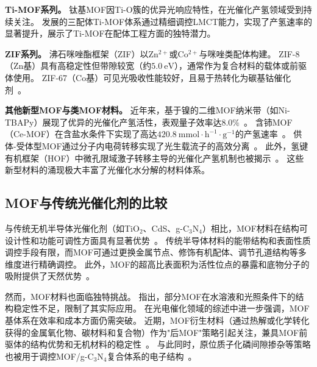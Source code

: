 \textbf{Ti-MOF系列。}
钛基MOF因Ti-O簇的优异光响应特性，在光催化产氢领域受到持续关注。
\citet{liu2024three_ligand_timof}发展的三配体Ti-MOF体系通过精细调控LMCT能力，实现了产氢速率的显著提升，展示了Ti-MOF在配体工程方面的独特潜力。 %

\textbf{ZIF系列。}
沸石咪唑酯框架（ZIF）以Zn$^{2+}$或Co$^{2+}$与咪唑类配体构建。
ZIF-8（Zn基）具有高稳定性但带隙较宽（约$5.0~\mathrm{eV}$），通常作为复合材料的载体或前驱体使用。 %
ZIF-67（Co基）可见光吸收性能较好，且易于热转化为碳基钴催化剂~\citep{singh2025mini_review}。 %

\textbf{其他新型MOF与类MOF材料。}
近年来，基于镍的二维MOF纳米带（如Ni-TBAPy）展现了优异的光催化产氢活性，表观量子效率达$8.0\%$~\citep{ni_tbpy_2020}。 %
含铈MOF（Ce-MOF）在含盐水条件下实现了高达$420.8~\mathrm{mmol \cdot h^{-1} \cdot g^{-1}}$的产氢速率~\citep{coce_mof_2025}。 %
供体-受体型MOF通过分子内电荷转移实现了光生载流子的高效分离~\citep{yan2023donor_acceptor_mof}。 %
此外，氢键有机框架（HOF）中微孔限域激子转移主导的光催化产氢机制也被揭示~\citep{zhou2023micropore_exciton}。 %
这些新型材料的涌现极大丰富了光催化水分解的材料体系。


\subsection{MOF与传统光催化剂的比较}

与传统无机半导体光催化剂（如TiO$_2$、CdS、g-C$_3$N$_4$）相比，MOF材料在结构可设计性和功能可调性方面具有显著优势~\citep{pmc2024mof_energy_env}。
传统半导体材料的能带结构和表面性质调控手段有限，而MOF可通过更换金属节点、修饰有机配体、调节孔道结构等多维度进行精确调控。 %
此外，MOF的超高比表面积为活性位点的暴露和底物分子的吸附提供了天然优势~\citep{reddy2021mof_h2_advances}。 %

然而，MOF材料也面临独特挑战。
\citet{hassan2024emerging_trends}指出，部分MOF在水溶液和光照条件下的结构稳定性不足，限制了其实际应用。 %
\citet{wang2025mof_pec_review}在光电催化领域的综述中进一步强调，MOF基体系在效率和成本方面仍需突破。 %
近期，MOF衍生材料（通过热解或化学转化获得的金属氧化物、碳材料和复合物）作为"后MOF"策略引起关注，兼具MOF前驱体的结构优势和无机材料的稳定性~\citep{singh2025mini_review}。 %
与此同时，原位质子化磷间隙掺杂等策略也被用于调控MOF/g-C$_3$N$_4$复合体系的电子结构~\citep{wang2023p_doped_cn}。 %
